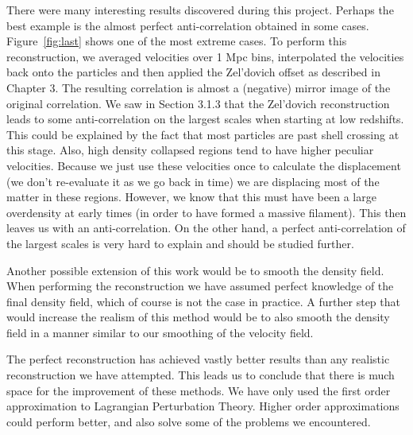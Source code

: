 There were many interesting results discovered during this project. Perhaps the best example is the almost perfect anti-correlation obtained in some cases. Figure~\ref{fig:last} shows one of the most extreme cases. To perform this reconstruction, we averaged velocities over 1 Mpc bins, interpolated the velocities back onto the particles and then applied the Zel'dovich offset as described in Chapter 3. The resulting correlation is almost a (negative) mirror image of the original correlation. We saw in Section 3.1.3 that the Zel'dovich reconstruction leads to some anti-correlation on the largest scales when starting at low redshifts. This could be explained by the fact that most particles are past shell crossing at this stage. Also, high density collapsed regions tend to have higher peculiar velocities. Because we just use these velocities once to calculate the displacement (we don't re-evaluate it as we go back in time) we are displacing most of the matter in these regions. However, we know that this must have been a large overdensity at early times (in order to have formed a massive filament). This then leaves us with an anti-correlation. On the other hand, a perfect anti-correlation of the largest scales is very hard to explain and should be studied further. 

Another possible extension of this work would be to smooth the density field. When performing the reconstruction we have assumed perfect knowledge of the final density field, which of course is not the case in practice. A further step that would increase the realism of this method would be to also smooth the density field in a manner similar to our smoothing of the velocity field.

The perfect reconstruction has achieved vastly better results than any realistic reconstruction we have attempted. This leads us to conclude that there is much space for the improvement of these methods. We have only used the first order approximation to Lagrangian Perturbation Theory. Higher order approximations could perform better, and also solve some of the problems we encountered.
    
